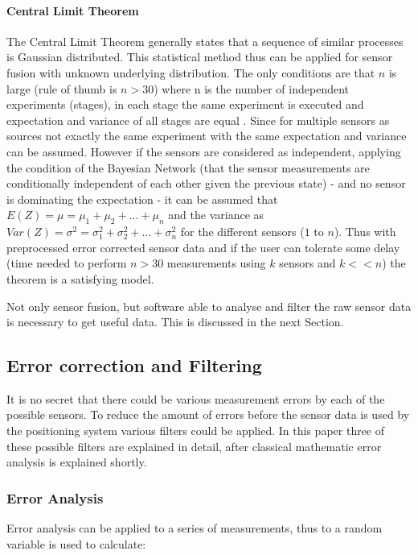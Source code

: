 \paragraph{Central Limit Theorem}
The Central Limit Theorem generally states that a sequence of similar processes is Gaussian distributed. This statistical method thus can be applied for sensor fusion with unknown underlying distribution. The only conditions are that $n$ is large (rule of thumb is $n>30$) where n is the number of independent experiments (stages), in each stage the same experiment is executed and expectation and variance of all stages are equal \parencite{kloess}. Since for multiple sensors as sources not exactly the same experiment with the same expectation and variance can be assumed. However if the sensors are considered as independent, applying the condition of the Bayesian Network (that the sensor measurements are conditionally independent of each other given the previous state) - and no sensor is dominating the expectation - it can be assumed that $E(Z) = \mu = \mu_1 + \mu_2 + ... + \mu_n$ and the variance as $Var(Z) = \sigma^2 = \sigma^2_1 + \sigma^2_2 + ... + \sigma^2_n$ for the different sensors ($1$ to $n$).
Thus with preprocessed error corrected sensor data and if the user can tolerate some delay (time needed to perform $n>30$ measurements using $k$ sensors and $k<<n$) the theorem is a satisfying model. 

Not only sensor fusion, but software able to analyse and filter the raw sensor data is necessary to get useful data. This is discussed in the next Section.

\subsection{Error correction and Filtering} \label{sec:error}
It is no secret that there could be various measurement errors by each of the possible sensors. To reduce the amount of errors before the sensor data is used by the positioning system various filters could be applied. In this paper three of these possible filters are explained in detail, after classical mathematic error analysis is explained shortly.

\subsubsection{Error Analysis}
Error analysis can be applied to a series of measurements, thus to a random variable is used to calculate:

